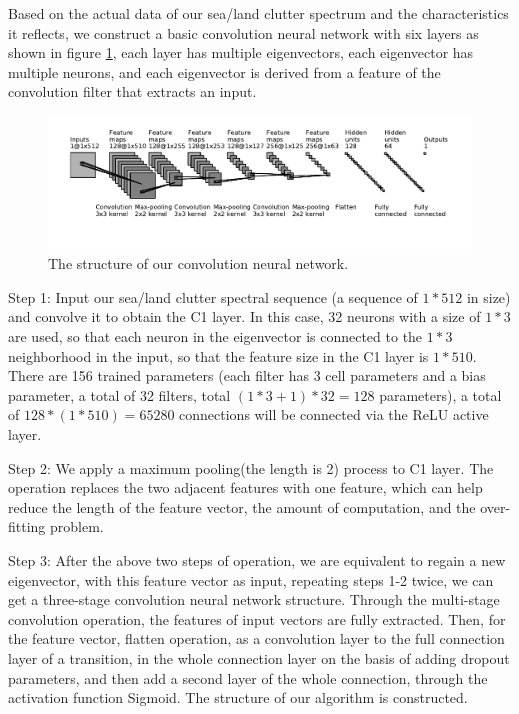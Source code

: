 Based on the actual data of our sea/land clutter spectrum and the characteristics it reflects, we construct a basic convolution neural network with six layers as shown in figure \ref{fig:struct}, each layer has multiple eigenvectors, each eigenvector has multiple neurons, and each eigenvector is derived from a feature of the convolution filter that extracts an input.
\begin{figure}[!t]
	\centering
	\includegraphics[width=7in]{figures/struct}
	\caption{The structure of our convolution neural network.}
	\label{fig:struct}
\end{figure}

Step 1: Input our sea/land clutter spectral sequence (a sequence of $1 * 512$ in size) and convolve it to obtain the C1 layer. In this case, 32 neurons with a size of $1 * 3$ are used, so that each neuron in the eigenvector is connected to the $1 * 3$ neighborhood in the input, so that the feature size in the C1 layer is $1 * 510$. There are 156 trained parameters (each filter has 3 cell parameters and a bias parameter, a total of 32 filters, total $(1 * 3 + 1) * 32 = 128$ parameters), a total of $128 * (1 * 510) = 65280$ connections will be connected via the ReLU active layer.

Step 2: We apply a maximum pooling(the length is 2) process to C1 layer. The operation replaces the two adjacent features with one feature, which can help reduce the length of the feature vector, the amount of computation, and the over-fitting problem.

Step 3: After the above two steps of operation, we are equivalent to regain a new eigenvector, with this feature vector as input, repeating steps 1-2 twice, we can get a three-stage convolution neural network structure. Through the multi-stage convolution operation, the features of input vectors are fully extracted. Then, for the feature vector, flatten operation, as a convolution layer to the full connection layer of a transition, in the whole connection layer on the basis of adding dropout parameters, and then add a second layer of the whole connection, through the activation function Sigmoid. The structure of our algorithm is constructed.

